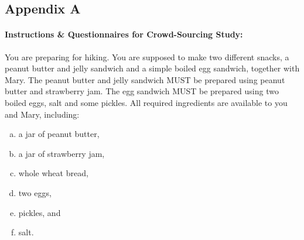 \documentclass[12pt]{report}
\begin{document}
\begin{appendices}
\chapter*{Appendix A}
\label{apdx:crowd-sourced-questionnaires}

\subsubsection{Instructions \& Questionnaires for Crowd-Sourcing Study:}
You are preparing for hiking. You are supposed to make two different snacks, a
peanut butter and jelly sandwich and a simple boiled egg sandwich, together with
Mary. The peanut butter and jelly sandwich MUST be prepared using peanut butter
and strawberry jam. The egg sandwich MUST be prepared using two boiled eggs,
salt and some pickles. All required ingredients are available to you and Mary,
including: 

\begin{enumerate}[a)]
  \setlength\itemsep{-3mm}
  \item a jar of peanut butter,
  \item a jar of strawberry jam,
  \item whole wheat bread,
  \item two eggs,
  \item pickles, and
  \item salt.
\end{enumerate}


\end{appendices}
\end{document}
